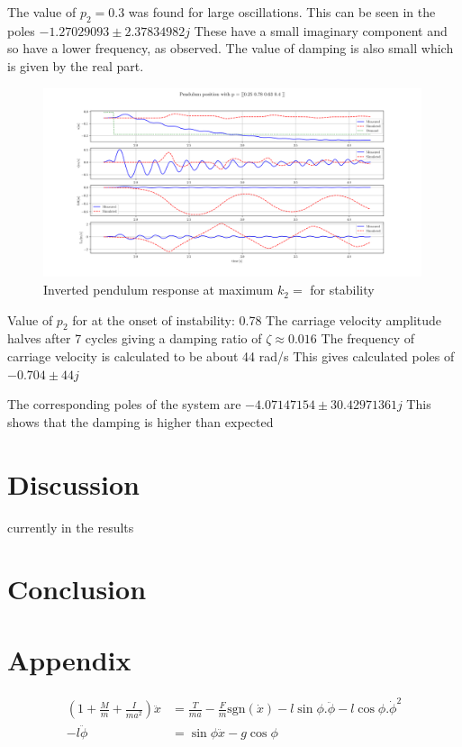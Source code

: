 \documentclass{article}
\begin{document}
The value of $p_2 = 0.3$ was found for large oscillations.
This can be seen in the poles $-1.27029093 \pm 2.37834982j$
These have a small imaginary component and so have a lower frequency, as observed.
The value of damping is also small which is given by the real part.

\begin{figure}[H]
  \centering
  \includegraphics[width=0.99\textwidth]{figures/4.4_hi.png}
  \caption{Inverted pendulum response at maximum $k_2 = $ for stability}
  \label{fig:roots4.4_hi}
\end{figure}

Value of $p_2$ for at the onset of instability: 0.78
The carriage velocity amplitude halves after 7 cycles giving a damping ratio of $\zeta \approx 0.016$
The frequency of carriage velocity is calculated to be about 44 rad/s
This gives calculated poles of $-0.704 \pm 44j$

The corresponding poles of the system are $-4.07147154 \pm 30.42971361j$
This shows that the damping is higher than expected 

\section{Discussion}

currently in the results


\section{Conclusion}


\newpage
\section{Appendix}

\begin{align}
  \left( 1 + \frac{M}{m} + \frac{I}{ma^2} \right) \ddot{x} &= \frac{T}{ma} - \frac{F}{m}\text{sgn}(\dot{x}) - l\sin\phi . \ddot{\phi} - l\cos\phi . \dot{\phi}^2 \\
   - l \ddot{\phi} &= \sin\phi \ddot{x} - g\cos\phi
\end{align}
\end{document}
